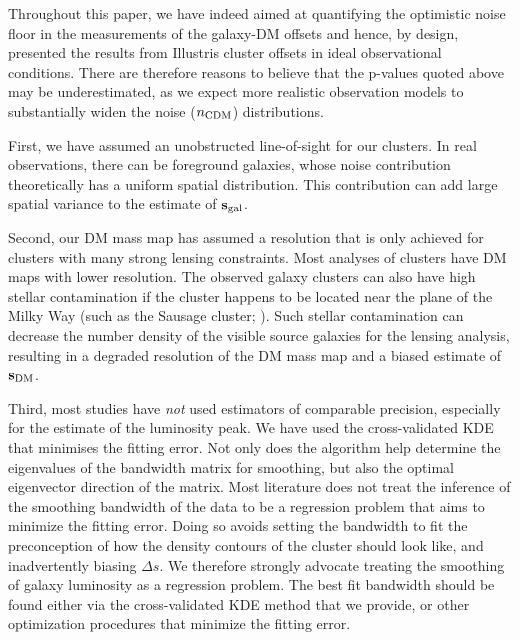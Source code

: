 \documentclass[usenatbib]{mn2e}
\begin{document}
{Throughout this paper, we have indeed aimed at quantifying the optimistic noise floor in the measurements of the galaxy-DM offsets and hence, by design, presented the results from Illustris cluster offsets in ideal observational conditions. There are therefore reasons to believe that the p-values quoted above may be underestimated, as we expect more realistic observation models to substantially widen the noise ($n_{\rm CDM}$) distributions.


First, we have assumed an unobstructed line-of-sight for our clusters. 
In real observations, there can be foreground galaxies, whose noise contribution
theoretically has a uniform spatial distribution. 
This contribution can add large spatial variance to the estimate of ${\bf
s}_{\rm gal}$. 

Second, our DM mass map has assumed a resolution that is only achieved for clusters 
with many strong lensing constraints. 
Most analyses of clusters have DM maps with lower resolution. 
The observed galaxy clusters can also have high stellar contamination
if the cluster happens to be located near the plane of the Milky Way 
(such as the Sausage cluster; \citealt{Jee2015}). 
Such stellar contamination can decrease the number density of the visible source galaxies for the
lensing analysis, resulting in a degraded resolution of the DM mass map and a
biased estimate of ${\bf s}_{\rm DM}$. 
  
Third, most studies have {\it not} used estimators of comparable precision, especially for
the estimate of the luminosity peak. We have used the cross-validated KDE that
minimises the fitting error. Not only does the algorithm help
determine the eigenvalues of the bandwidth matrix for smoothing, 
but also the optimal eigenvector direction of the matrix. 
Most literature does not treat the inference of the smoothing bandwidth 
of the data to be a regression problem that aims to minimize the fitting error.  
Doing so
avoids setting the bandwidth to fit the preconception of how the density
contours of the cluster 
should look like, and inadvertently biasing $\Delta s$. We therefore strongly
advocate treating the smoothing of galaxy luminosity as a regression problem.
The best fit bandwidth should be found either via 
the cross-validated KDE method that we provide, or other optimization  
procedures that minimize the fitting error.


}
\end{document}
